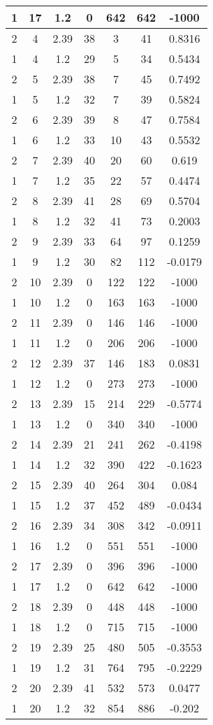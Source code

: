\documentclass[letterpaper, 12pt]{article}
\begin{document}
\begin{longtable}{|c|c|c|c|c|c|c|}
\hline
1 & 17 & 1.2 & 0 & 642 & 642 & -1000 \\
\hline
2 & 4 & 2.39 & 38 & 3 & 41 & 0.8316 \\
\hline
1 & 4 & 1.2 & 29 & 5 & 34 & 0.5434 \\
\hline
2 & 5 & 2.39 & 38 & 7 & 45 & 0.7492 \\
\hline
1 & 5 & 1.2 & 32 & 7 & 39 & 0.5824 \\
\hline
2 & 6 & 2.39 & 39 & 8 & 47 & 0.7584 \\
\hline
1 & 6 & 1.2 & 33 & 10 & 43 & 0.5532 \\
\hline
2 & 7 & 2.39 & 40 & 20 & 60 & 0.619 \\
\hline
1 & 7 & 1.2 & 35 & 22 & 57 & 0.4474 \\
\hline
2 & 8 & 2.39 & 41 & 28 & 69 & 0.5704 \\
\hline
1 & 8 & 1.2 & 32 & 41 & 73 & 0.2003 \\
\hline
2 & 9 & 2.39 & 33 & 64 & 97 & 0.1259 \\
\hline
1 & 9 & 1.2 & 30 & 82 & 112 & -0.0179 \\
\hline
2 & 10 & 2.39 & 0 & 122 & 122 & -1000 \\
\hline
1 & 10 & 1.2 & 0 & 163 & 163 & -1000 \\
\hline
2 & 11 & 2.39 & 0 & 146 & 146 & -1000 \\
\hline
1 & 11 & 1.2 & 0 & 206 & 206 & -1000 \\
\hline
2 & 12 & 2.39 & 37 & 146 & 183 & 0.0831 \\
\hline
1 & 12 & 1.2 & 0 & 273 & 273 & -1000 \\
\hline
2 & 13 & 2.39 & 15 & 214 & 229 & -0.5774 \\
\hline
1 & 13 & 1.2 & 0 & 340 & 340 & -1000 \\
\hline
2 & 14 & 2.39 & 21 & 241 & 262 & -0.4198 \\
\hline
1 & 14 & 1.2 & 32 & 390 & 422 & -0.1623 \\
\hline
2 & 15 & 2.39 & 40 & 264 & 304 & 0.084 \\
\hline
1 & 15 & 1.2 & 37 & 452 & 489 & -0.0434 \\
\hline
2 & 16 & 2.39 & 34 & 308 & 342 & -0.0911 \\
\hline
1 & 16 & 1.2 & 0 & 551 & 551 & -1000 \\
\hline
2 & 17 & 2.39 & 0 & 396 & 396 & -1000 \\
\hline
1 & 17 & 1.2 & 0 & 642 & 642 & -1000 \\
\hline
2 & 18 & 2.39 & 0 & 448 & 448 & -1000 \\
\hline
1 & 18 & 1.2 & 0 & 715 & 715 & -1000 \\
\hline
2 & 19 & 2.39 & 25 & 480 & 505 & -0.3553 \\
\hline
1 & 19 & 1.2 & 31 & 764 & 795 & -0.2229 \\
\hline
2 & 20 & 2.39 & 41 & 532 & 573 & 0.0477 \\
\hline
1 & 20 & 1.2 & 32 & 854 & 886 & -0.202 \\
\hline
\end{longtable}
\end{document}
